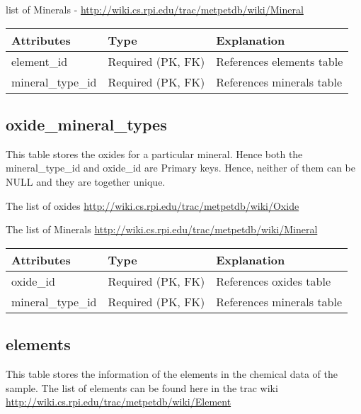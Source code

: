 \documentclass[letterpaper,10pt,english]{sphinxmanual}
\begin{document}
list of Minerals - \href{http://wiki.cs.rpi.edu/trac/metpetdb/wiki/Mineral}{http://wiki.cs.rpi.edu/trac/metpetdb/wiki/Mineral}

\begin{tabulary}{\linewidth}{|L|L|L|}
\hline
\textbf{
Attributes
} & \textbf{
Type
} & \textbf{
Explanation
}\\\hline

element\_id
 & 
Required (PK, FK)
 & 
References elements table
\\\hline

mineral\_type\_id
 & 
Required (PK, FK)
 & 
References minerals table
\\\hline
\end{tabulary}



\subsection{oxide\_mineral\_types}
\label{Table_Description:oxide-mineral-types}
This table stores the oxides for a particular mineral.  Hence both the mineral\_type\_id and oxide\_id are Primary keys. Hence, neither of them can be NULL and they are together unique.

The list of oxides \href{http://wiki.cs.rpi.edu/trac/metpetdb/wiki/Oxide}{http://wiki.cs.rpi.edu/trac/metpetdb/wiki/Oxide}

The list of Minerals \href{http://wiki.cs.rpi.edu/trac/metpetdb/wiki/Mineral}{http://wiki.cs.rpi.edu/trac/metpetdb/wiki/Mineral}

\begin{tabulary}{\linewidth}{|L|L|L|}
\hline
\textbf{
Attributes
} & \textbf{
Type
} & \textbf{
Explanation
}\\\hline

oxide\_id
 & 
Required (PK, FK)
 & 
References oxides table
\\\hline

mineral\_type\_id
 & 
Required (PK, FK)
 & 
References minerals table
\\\hline
\end{tabulary}



\subsection{elements}
\label{Table_Description:elements}
This table stores the information of the elements in the chemical data of the sample.
The list of elements can be found here in the trac wiki \href{http://wiki.cs.rpi.edu/trac/metpetdb/wiki/Element}{http://wiki.cs.rpi.edu/trac/metpetdb/wiki/Element}
\end{document}
